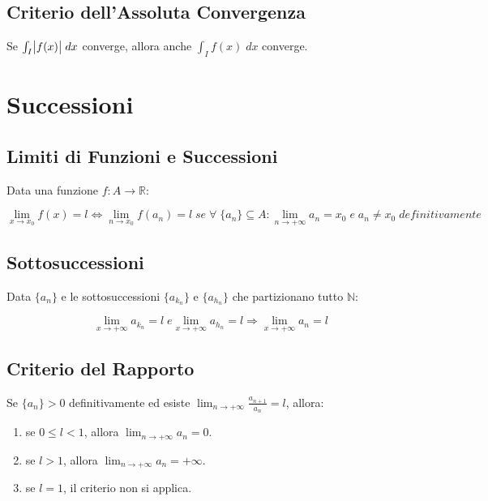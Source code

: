 \documentclass{article}
\begin{document}
\subsection{Criterio dell'Assoluta Convergenza}

Se $\int_I{\abs{f(x)}} \; dx$ converge, allora anche $\int_I f(x) \; dx$ converge.

\section{Successioni}

\subsection{Limiti di Funzioni e Successioni}

Data una funzione $f: A \rightarrow \mathbb{R}$:

\begin{equation*}
    \displaystyle \lim_{x \to x_0} f(x) = l \Leftrightarrow \lim_{n \to x_0} f(a_n) = l \; se \; \forall \; \{a_n\} \subseteq A : \lim_{n \to + \infty} a_n = x_0 \; e \; a_n \neq x_0 \; definitivamente
\end{equation*}

\subsection{Sottosuccessioni}

Data $\{a_n\}$ e le sottosuccessioni $\{a_{k_n}\}$ e $\{a_{h_n}\}$ che partizionano tutto $\mathbb{N}$:

\begin{equation*}
    \displaystyle \lim_{x \to + \infty} a_{k_n} = l \; e \lim_{x \to + \infty} a_{h_n} = l \Rightarrow \lim_{x \to + \infty} a_n = l
\end{equation*}

\subsection{Criterio del Rapporto}

Se $\{a_n\} > 0$ definitivamente ed esiste $\displaystyle \lim_{n \to + \infty} \frac{a_{n+1}}{a_n} = l$, allora:

\begin{enumerate}
    \item se $0 \leq l < 1$, allora $\displaystyle \lim_{n \to + \infty} a_n = 0$.
    \item se $l > 1$, allora $\displaystyle \lim_{n \to + \infty} a_n = + \infty$.
    \item se $l = 1$, il criterio non si applica.
\end{enumerate}
\end{document}
